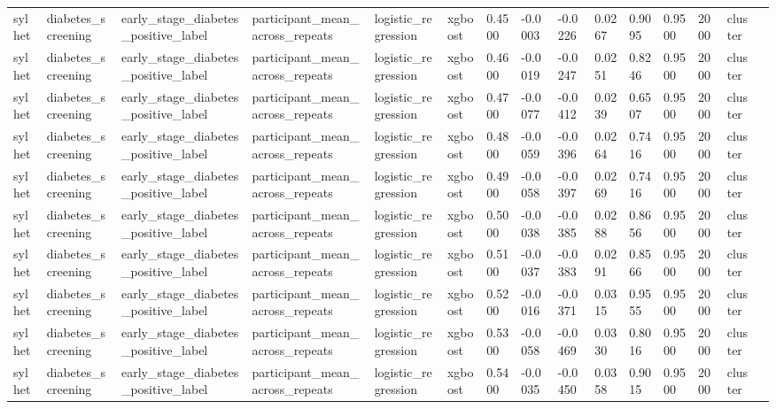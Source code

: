 \begin{tabular}{lllllllllllllll}
sylhet & diabetes\_screening & early\_stage\_diabetes\_positive\_label & participant\_mean\_across\_repeats & logistic\_regression & xgboost & 0.4500 & -0.0003 & -0.0226 & 0.0267 & 0.9095 & 0.9500 & 2000 & cluster &  \\
sylhet & diabetes\_screening & early\_stage\_diabetes\_positive\_label & participant\_mean\_across\_repeats & logistic\_regression & xgboost & 0.4600 & -0.0019 & -0.0247 & 0.0251 & 0.8246 & 0.9500 & 2000 & cluster &  \\
sylhet & diabetes\_screening & early\_stage\_diabetes\_positive\_label & participant\_mean\_across\_repeats & logistic\_regression & xgboost & 0.4700 & -0.0077 & -0.0412 & 0.0239 & 0.6507 & 0.9500 & 2000 & cluster &  \\
sylhet & diabetes\_screening & early\_stage\_diabetes\_positive\_label & participant\_mean\_across\_repeats & logistic\_regression & xgboost & 0.4800 & -0.0059 & -0.0396 & 0.0264 & 0.7416 & 0.9500 & 2000 & cluster &  \\
sylhet & diabetes\_screening & early\_stage\_diabetes\_positive\_label & participant\_mean\_across\_repeats & logistic\_regression & xgboost & 0.4900 & -0.0058 & -0.0397 & 0.0269 & 0.7416 & 0.9500 & 2000 & cluster &  \\
sylhet & diabetes\_screening & early\_stage\_diabetes\_positive\_label & participant\_mean\_across\_repeats & logistic\_regression & xgboost & 0.5000 & -0.0038 & -0.0385 & 0.0288 & 0.8656 & 0.9500 & 2000 & cluster &  \\
sylhet & diabetes\_screening & early\_stage\_diabetes\_positive\_label & participant\_mean\_across\_repeats & logistic\_regression & xgboost & 0.5100 & -0.0037 & -0.0383 & 0.0291 & 0.8566 & 0.9500 & 2000 & cluster &  \\
sylhet & diabetes\_screening & early\_stage\_diabetes\_positive\_label & participant\_mean\_across\_repeats & logistic\_regression & xgboost & 0.5200 & -0.0016 & -0.0371 & 0.0315 & 0.9555 & 0.9500 & 2000 & cluster &  \\
sylhet & diabetes\_screening & early\_stage\_diabetes\_positive\_label & participant\_mean\_across\_repeats & logistic\_regression & xgboost & 0.5300 & -0.0058 & -0.0469 & 0.0330 & 0.8016 & 0.9500 & 2000 & cluster &  \\
sylhet & diabetes\_screening & early\_stage\_diabetes\_positive\_label & participant\_mean\_across\_repeats & logistic\_regression & xgboost & 0.5400 & -0.0035 & -0.0450 & 0.0358 & 0.9015 & 0.9500 & 2000 & cluster &  \\

\end{tabular}
